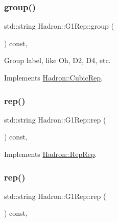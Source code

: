 \subsubsection{\texorpdfstring{group()}{group()}\hspace{0.1cm}{\footnotesize\ttfamily [2/2]}}
{\footnotesize\ttfamily std\+::string Hadron\+::\+G1\+Rep\+::group (\begin{DoxyParamCaption}{ }\end{DoxyParamCaption}) const\hspace{0.3cm}{\ttfamily [inline]}, {\ttfamily [virtual]}}

Group label, like Oh, D2, D4, etc. 

Implements \mbox{\hyperlink{structHadron_1_1CubicRep_a0748f11ec87f387062c8e8981339a29c}{Hadron\+::\+Cubic\+Rep}}.

\mbox{\label{structHadron_1_1G1Rep_a2da49f8741322aebd7903da15cb9b751}} 
\subsubsection{\texorpdfstring{rep()}{rep()}\hspace{0.1cm}{\footnotesize\ttfamily [1/3]}}
{\footnotesize\ttfamily std\+::string Hadron\+::\+G1\+Rep\+::rep (\begin{DoxyParamCaption}{ }\end{DoxyParamCaption}) const\hspace{0.3cm}{\ttfamily [inline]}, {\ttfamily [virtual]}}



Implements \mbox{\hyperlink{structHadron_1_1RepRep_ab3213025f6de249f7095892109575fde}{Hadron\+::\+Rep\+Rep}}.

\mbox{\label{structHadron_1_1G1Rep_a2da49f8741322aebd7903da15cb9b751}} 
\subsubsection{\texorpdfstring{rep()}{rep()}\hspace{0.1cm}{\footnotesize\ttfamily [2/3]}}
{\footnotesize\ttfamily std\+::string Hadron\+::\+G1\+Rep\+::rep (\begin{DoxyParamCaption}{ }\end{DoxyParamCaption}) const\hspace{0.3cm}{\ttfamily [inline]}, {\ttfamily [virtual]}}



